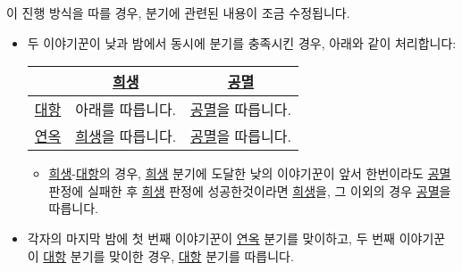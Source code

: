 \documentclass{report}
\begin{document}
	이 진행 방식을 따를 경우, 분기에 관련된 내용이 조금 수정됩니다.
	
	\begin{itemize}
		\item 두 이야기꾼이 낮과 밤에서 동시에 분기를 충족시킨 경우, 아래와 같이 처리합니다:
		\begin{tightcenter}
			\begin{tabular}{!{\color{black}\vrule}c!{\color{black}\vrule}!{\color{black}\vrule}c!{\color{black}\vrule}c!{\color{black}\vrule}}
				\hline
				& \hyperlink{dream-sacrifice}{희생}             & \hyperlink{dream-corruption}{공멸} \\\hline\hline
				\hyperlink{dream-fight}{대항} & 아래를 따릅니다.     & \hyperlink{dream-corruption}{공멸}을 따릅니다. \\\hline
				\hyperlink{dream-limbo}{연옥} & \hyperlink{dream-sacrifice}{희생}을 따릅니다. & \hyperlink{dream-corruption}{공멸}을 따릅니다. \\\hline
			\end{tabular}
		\end{tightcenter}
		\begin{itemize}
			\item \hyperlink{dream-sacrifice}{희생}-\hyperlink{dream-fight}{대항}의 경우, \hyperlink{dream-sacrifice}{희생} 분기에 도달한 낮의 이야기꾼이 앞서 한번이라도 \hyperlink{dream-corruption}{공멸} 판정에 실패한 후 \hyperlink{dream-sacrifice}{희생} 판정에 성공한것이라면 \hyperlink{dream-sacrifice}{희생}을, 그 이외의 경우 \hyperlink{dream-corruption}{공멸}을 따릅니다.
		\end{itemize}
		\item 각자의 마지막 밤에 첫 번째 이야기꾼이 \hyperlink{dream-limbo}{연옥} 분기를 맞이하고, 두 번째 이야기꾼이 \hyperlink{dream-fight}{대항} 분기를 맞이한 경우, \hyperlink{dream-fight}{대항} 분기를 따릅니다.
	\end{itemize}
\end{document}
